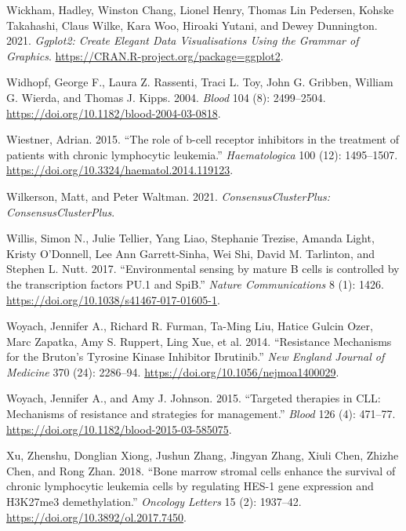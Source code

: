 \documentclass[11pt, a4paper, twosided]{book}
\newenvironment{CSLReferences}%
  {}%
  {\par}
\begin{document}
\begin{CSLReferences}{1}{0}
\leavevmode{}%
Wickham, Hadley, Winston Chang, Lionel Henry, Thomas Lin Pedersen, Kohske Takahashi, Claus Wilke, Kara Woo, Hiroaki Yutani, and Dewey Dunnington. 2021. \emph{Ggplot2: Create Elegant Data Visualisations Using the Grammar of Graphics}. \url{https://CRAN.R-project.org/package=ggplot2}.

\leavevmode{}%
Widhopf, George F., Laura Z. Rassenti, Traci L. Toy, John G. Gribben, William G. Wierda, and Thomas J. Kipps. 2004. \emph{Blood} 104 (8): 2499--2504. \url{https://doi.org/10.1182/blood-2004-03-0818}.

\leavevmode{}%
Wiestner, Adrian. 2015. {``{The role of b-cell receptor inhibitors in the treatment of patients with chronic lymphocytic leukemia}.''} \emph{Haematologica} 100 (12): 1495--1507. \url{https://doi.org/10.3324/haematol.2014.119123}.

\leavevmode{}%
Wilkerson, Matt, and Peter Waltman. 2021. \emph{ConsensusClusterPlus: ConsensusClusterPlus}.

\leavevmode{}%
Willis, Simon N., Julie Tellier, Yang Liao, Stephanie Trezise, Amanda Light, Kristy O'Donnell, Lee Ann Garrett-Sinha, Wei Shi, David M. Tarlinton, and Stephen L. Nutt. 2017. {``{Environmental sensing by mature B cells is controlled by the transcription factors PU.1 and SpiB}.''} \emph{Nature Communications} 8 (1): 1426. \url{https://doi.org/10.1038/s41467-017-01605-1}.

\leavevmode{}%
Woyach, Jennifer A., Richard R. Furman, Ta-Ming Liu, Hatice Gulcin Ozer, Marc Zapatka, Amy S. Ruppert, Ling Xue, et al. 2014. {``{Resistance Mechanisms for the Bruton's Tyrosine Kinase Inhibitor Ibrutinib}.''} \emph{New England Journal of Medicine} 370 (24): 2286--94. \url{https://doi.org/10.1056/nejmoa1400029}.

\leavevmode{}%
Woyach, Jennifer A., and Amy J. Johnson. 2015. {``{Targeted therapies in CLL: Mechanisms of resistance and strategies for management}.''} \emph{Blood} 126 (4): 471--77. \url{https://doi.org/10.1182/blood-2015-03-585075}.

\leavevmode{}%
Xu, Zhenshu, Donglian Xiong, Jushun Zhang, Jingyan Zhang, Xiuli Chen, Zhizhe Chen, and Rong Zhan. 2018. {``{Bone marrow stromal cells enhance the survival of chronic lymphocytic leukemia cells by regulating HES-1 gene expression and H3K27me3 demethylation}.''} \emph{Oncology Letters} 15 (2): 1937--42. \url{https://doi.org/10.3892/ol.2017.7450}.


\end{CSLReferences}
\end{document}
